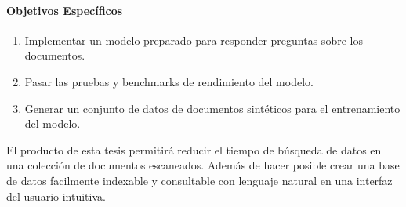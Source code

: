 \documentclass[../main.tex]{subfiles}
\begin{document}
\paragraph{Objetivos Específicos}

\begin{enumerate}
    \item Implementar un modelo preparado para responder preguntas sobre los documentos.
    \item Pasar las pruebas y benchmarks de rendimiento del modelo.
    \item Generar un conjunto de datos de documentos sintéticos para el entrenamiento del modelo.
\end{enumerate}

%


El producto de esta tesis permitirá reducir el tiempo de búsqueda de datos en una
colección de documentos escaneados.
Además de hacer posible crear una base de datos facilmente indexable y consultable con lenguaje natural en una interfaz del usuario intuitiva.
\end{document}

